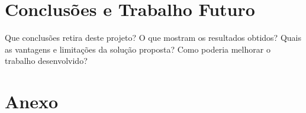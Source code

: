 \documentclass[a4paper]{article}
\begin{document}
\newpage

\section{Conclusões e Trabalho Futuro }

Que conclusões retira deste projeto? O que mostram os resultados obtidos? Quais as vantagens e limitações da solução proposta? Como poderia melhorar o trabalho desenvolvido?

\clearpage
{}
\renewcommand\refname{Bibliografia}




\newpage
\appendix
\section{Anexo}
\end{document}
